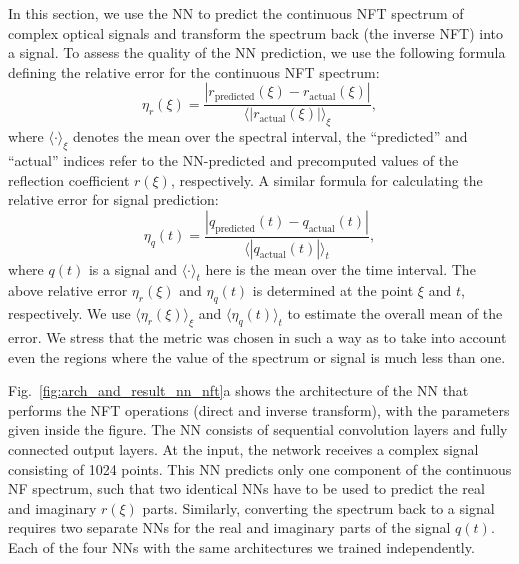 In this section, we use the NN to predict the continuous NFT spectrum of complex optical signals and transform the spectrum back (the inverse NFT) into a signal. 
To assess the quality of the NN prediction, we use the following formula defining the relative error for the continuous NFT spectrum:
\begin{equation}
    \eta_r(\xi) = \frac{|r_\text{predicted}(\xi) - r_\text{actual}(\xi)| }{\langle |r_\text{actual}(\xi)| \rangle_{\xi}} {,}
\end{equation}
where $\langle \cdot \rangle_{\xi}$ denotes the mean over the spectral interval, the ``predicted'' and ``actual'' indices refer to the NN-predicted and precomputed values of the reflection coefficient $r(\xi)$, respectively. A similar formula for calculating the relative error for signal prediction:
\begin{equation}
    \eta_q(t) = \frac{|q_\text{predicted}(t) - q_\text{actual}(t)| }{\langle |q_\text{actual}(t)| \rangle_{t}} {,}
\end{equation}
where $q(t)$ is a signal and $\langle \cdot \rangle_{t}$ here is the mean over the time interval. The above relative error $\eta_r(\xi)$ and $\eta_q(t)$ is determined at the point $\xi$ and $t$, respectively. We use $\langle \eta_r(\xi) \rangle_{\xi}$ and $\langle \eta_q(t) \rangle_{t}$ to estimate the overall mean of the error. We stress that the metric was chosen in such a way as to take into account even the regions where the value of the spectrum or signal is much less than one.






Fig.~\ref{fig:arch_and_result_nn_nft}a shows the architecture of the NN that performs the NFT operations (direct and inverse transform), with the parameters given inside the figure. The NN consists of sequential convolution layers and fully connected output layers. At the input, the network receives a complex signal consisting of 1024 points. This NN predicts only one component of the continuous NF spectrum, such that two identical NNs have to be used to predict the real and imaginary $r(\xi)$ parts. Similarly, converting the spectrum back to a signal requires two separate NNs for the real and imaginary parts of the signal $q(t)$. Each of the four NNs with the same architectures we trained independently.

